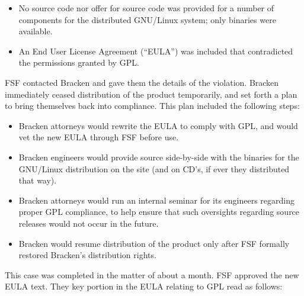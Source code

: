 \documentclass[12pt]{report}
\begin{document}
\begin{itemize}

\item No source code nor offer for source code was provided for a number
  of components for the distributed GNU/Linux system; only binaries were
  available.

\item An End User License Agreement (``EULA'') was included that
  contradicted the permissions granted by GPL\@.
\end{itemize}

FSF contacted Bracken and gave them the details of the violation.  Bracken
immediately ceased distribution of the product temporarily, and set forth
a plan to bring themselves back into compliance.  This plan included the
following steps:

\begin{itemize}

\item Bracken attorneys would rewrite the EULA to comply with GPL, and
  would vet the new EULA through FSF before use.

\item Bracken engineers would provide source side-by-side with the
  binaries for the GNU/Linux distribution on the site (and on CD's, if
  ever they distributed that way).

\item Bracken attorneys would run an internal seminar for its engineers
  regarding proper GPL compliance, to help ensure that such oversights
  regarding source releases would not occur in the future.

\item Bracken would resume distribution of the product only after FSF
  formally restored Bracken's distribution rights.
\end{itemize}

This case was completed in the matter of about a month.  FSF approved the
new EULA text.  They key portion in the EULA relating to GPL read as
follows:
\end{document}

